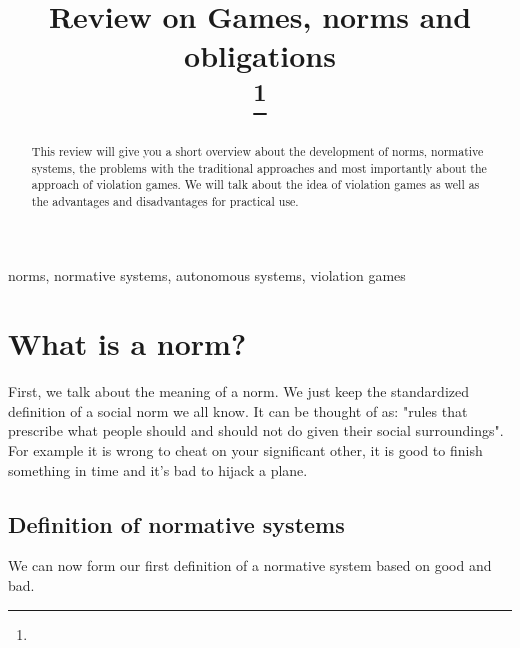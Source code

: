 \documentclass[conference]{IEEE}
\begin{document}
\title{Review on Games, norms and obligations
\\
{\footnotesize \textsuperscript{}}
\thanks{}
}

\author{
\and
{}

}

\maketitle

\begin{abstract}
This review will give you a short overview about the development of norms, normative systems, the problems with the traditional approaches and most importantly about the approach of violation games. We will talk about the idea of violation games as well as the advantages and disadvantages for practical use.
\end{abstract}

\begin{IEEEkeywords}
norms, normative systems, autonomous systems, violation games
\end{IEEEkeywords}


\section{What is a norm?}

First, we talk about the meaning of a norm. We just keep the standardized definition of a social norm we all know. It can be thought of as: "rules that prescribe what people should and should not do given their social surroundings"\cite{b1}. For example it is wrong to cheat on your significant other, it is good to finish something in time and it's bad to hijack a plane. 
\subsection{Definition of normative systems}
We can now form our first definition of a normative system based on good and bad.\\
\end{document}
